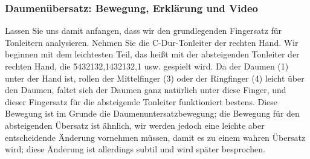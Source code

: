 \subsubsection{Daumenübersatz: Bewegung, Erklärung und Video}
\label{c1iii5b}

Lassen Sie uns damit anfangen, dass wir den grundlegenden Fingersatz für Tonleitern analysieren.
Nehmen Sie die C-Dur-Tonleiter der rechten Hand.
Wir beginnen mit dem leichtesten Teil, das heißt mit der absteigenden Tonleiter der rechten Hand, die 5432132,1432132,1 usw. gespielt wird.
Da der Daumen (1) unter der Hand ist, rollen der Mittelfinger (3) oder der Ringfinger (4) leicht über den Daumen, faltet sich der Daumen ganz natürlich unter diese Finger, und dieser Fingersatz für die absteigende Tonleiter funktioniert bestens.
Diese Bewegung ist im Grunde die Daumenuntersatzbewegung; die Bewegung für den absteigenden Übersatz ist ähnlich, wir werden jedoch eine leichte aber entscheidende Änderung vornehmen müssen, damit es zu einem wahren Übersatz wird; diese Änderung ist allerdings subtil und wird später besprochen.

